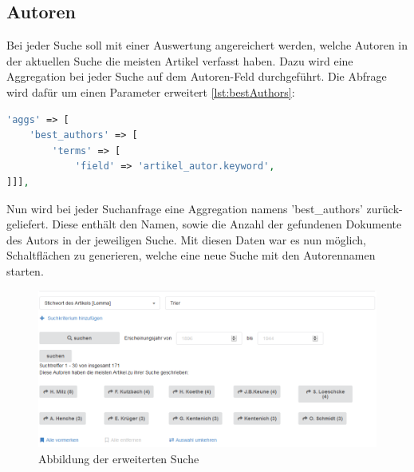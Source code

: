 \subsection{Autoren}

Bei jeder Suche soll mit einer Auswertung angereichert werden, welche Autoren in der aktuellen Suche die meisten Artikel verfasst haben. Dazu wird eine Aggregation bei jeder Suche auf dem Autoren-Feld durchgeführt. Die Abfrage wird dafür um einen Parameter erweitert \ref{lst:bestAuthors}:

\begin{lstlisting}[language=PHP, frame=single, label={lst:bestAuthors}, caption=Auschnitt aus der Abfrage zur Aggregation der Autoren,captionpos=b] 
'aggs' => [
    'best_authors' => [
        'terms' => [
            'field' => 'artikel_autor.keyword',
]]],
\end{lstlisting}


Nun wird bei jeder Suchanfrage eine Aggregation namens 'best\_authors' zurück-geliefert. Diese enthält den Namen, sowie die Anzahl der gefundenen Dokumente des Autors in der jeweiligen Suche. 
Mit diesen Daten war es nun möglich, Schaltflächen zu generieren, welche eine neue Suche mit den Autorennamen starten. \cite{ElasticsearchB.V..13.2.2020}


\begin{figure}
	\centering
	\includegraphics[width=1\linewidth]{images/best_authors.png}
	\caption{Abbildung der erweiterten Suche}
	\label{img:erweiterteSuche}
\end{figure}
